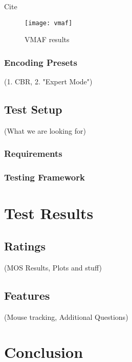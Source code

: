 \documentclass[conference]{IEEEtran}
\begin{document}
Cite \cite{lin2014:fvqa}

\begin{figure}[!t]
\centering
\texttt{[image: vmaf]}
\caption{VMAF results}
\label{fig:vmaf}
\end{figure}

\subsubsection{Encoding Presets}
(1. CBR, 2. "Expert Mode")

\subsection{Test Setup}
(What we are looking for)

\subsubsection{Requirements}

\subsubsection{Testing Framework}

\section{Test Results}
\subsection{Ratings}
(MOS Results, Plots and stuff)

\subsection{Features}
(Mouse tracking, Additional Questions)


\section{Conclusion}






\end{document}
